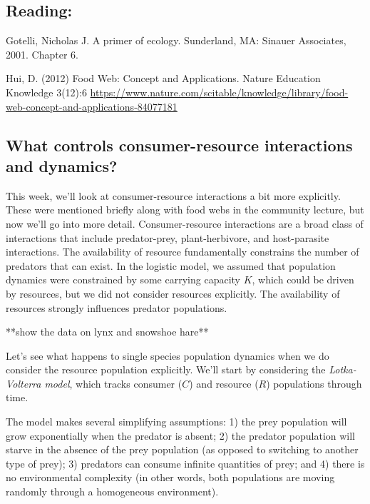 \documentclass[12pt]{article}
\begin{document}
\subsection*{Reading:}

Gotelli, Nicholas J. A primer of ecology. Sunderland, MA: Sinauer Associates, 2001. Chapter 6.\\

\bigskip

Hui, D. (2012) Food Web: Concept and Applications. Nature Education Knowledge 3(12):6 \url{https://www.nature.com/scitable/knowledge/library/food-web-concept-and-applications-84077181}








\begin{center}
\noindent\hrulefill 
\end{center}



\clearpage

\subsection*{What controls consumer-resource interactions and dynamics?}

This week, we'll look at consumer-resource interactions a bit more explicitly. These were mentioned briefly along with food webs in the community lecture, but now we'll go into more detail. Consumer-resource interactions are a broad class of interactions that include predator-prey, plant-herbivore, and host-parasite interactions. The availability of resource fundamentally constrains the number of predators that can exist. In the logistic model, we assumed that population dynamics were constrained by some carrying capacity $K$, which could be driven by resources, but we did not consider resources explicitly. The availability of resources strongly influences predator populations. 



**show the data on lynx and snowshoe hare**





Let's see what happens to single species population dynamics when we do consider the resource population explicitly. We'll start by considering the \textit{Lotka-Volterra model}, which tracks consumer ($C$) and resource ($R$) populations through time. 


The model makes several simplifying assumptions: 1) the prey population will grow exponentially when the predator is absent; 2) the predator population will starve in the absence of the prey population (as opposed to switching to another type of prey); 3) predators can consume infinite quantities of prey; and 4) there is no environmental complexity (in other words, both populations are moving randomly through a homogeneous environment).
\end{document}
